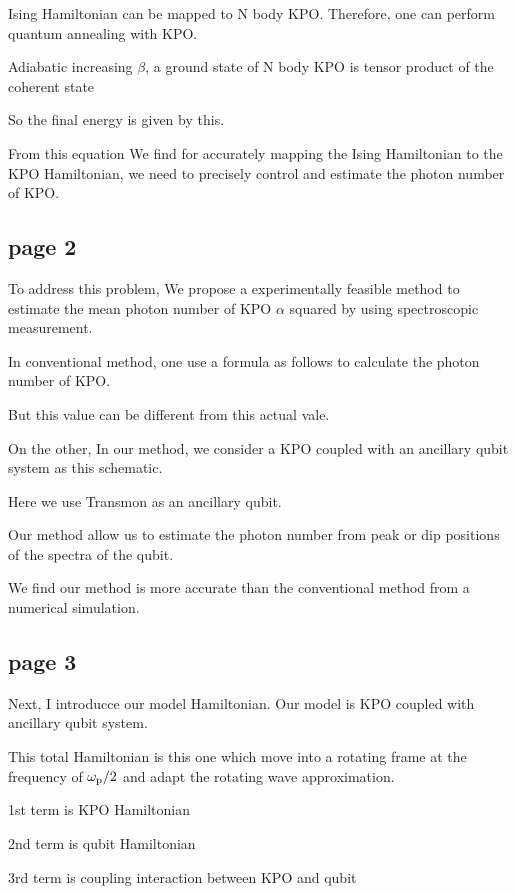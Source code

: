 {{%

 Ising Hamiltonian can be mapped to N body KPO. 
 Therefore, one can perform quantum annealing with KPO.
 
Adiabatic increasing $\beta$, a ground state of N body KPO is tensor product of the coherent state 

So the final energy is given by this.

From this equation We find for accurately mapping the Ising Hamiltonian to the KPO Hamiltonian, we need to precisely control and estimate the photon number of KPO.

\subsection{page 2}

To address this problem, We propose a experimentally feasible method to estimate the mean photon number of KPO $\alpha$ squared by using spectroscopic measurement.

In conventional method, one use a formula as follows to calculate the photon number of KPO.

But this value can be different from this actual vale.

On the other, In our method, we consider a KPO coupled with an ancillary qubit system as this schematic.

Here we use Transmon as an ancillary qubit.

Our method allow us to estimate the photon number from peak or dip positions of the spectra of the qubit.

We find our method is more accurate than the conventional method from a numerical simulation.



\subsection{page 3}
Next, I introducce our model Hamiltonian.
Our model is KPO coupled with ancillary qubit system.


This total Hamiltonian is this one which move into a rotating frame at the frequency
of $\omega_{\rm{p}}/2$ and adapt the rotating wave approximation.

1st term is KPO Hamiltonian

2nd term is qubit Hamiltonian

3rd term is coupling interaction between KPO and qubit

}}
